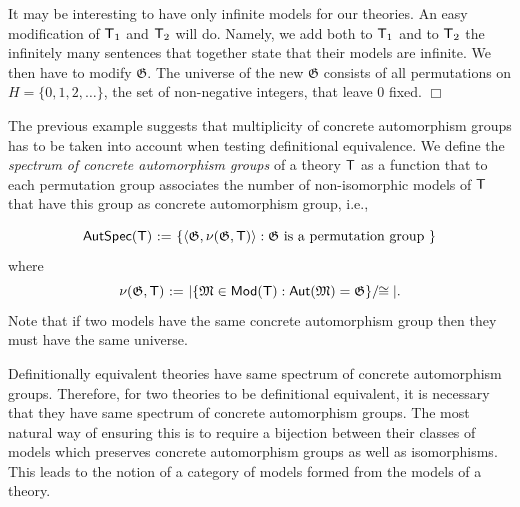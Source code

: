 \documentclass[12pt,leqno]{article}
\newcommand{\de}{\mbox{\ :=\ }}
\newcommand{\Mm}{\mbox{$\mathfrak M$}}
\newcommand{\Gg}{\mbox{$\mathfrak G$}}
\newcommand{\Aut}{\mbox{\sf Aut}}
\newcommand{\AutSpec}{\mbox{\sf AutSpec}}
\newcommand{\T}{\mbox{\sf T}}
\newcommand{\Mod}{\mbox{\sf Mod}}
\begin{document}
It may be interesting to have only infinite models for our theories.
An easy modification of $\T_1$ and $\T_2$ will do. Namely, we add
both to $\T_1$ and to $\T_2$ the infinitely many sentences that
together state that their models are infinite. We then have to
modify $\Gg$. The universe of the new $\Gg$ consists of
all permutations on $H=\{ 0,1,2,\dots\}$, the set of non-negative
integers, that leave 0 fixed. $\Box$
\bigskip

The previous example suggests that multiplicity of concrete automorphism
groups has to be taken into account when testing definitional
equivalence. We define the {\it spectrum of concrete automorphism groups} of a theory $\T$ as
a function that to each permutation group associates the number of non-isomorphic models of $\T$ that have this group as concrete automorphism group, i.e.,

\[ \AutSpec(\T)\de \{\langle \Gg, \nu(\Gg,\T)\rangle : \Gg \mbox{ is a permutation group }\}\]
where
\[\nu(\Gg,\T) \de \vert\{\Mm\in\Mod(\T) : \Aut(\Mm)=\Gg\}\slash\!\!\cong\vert.\]
%
Note that if two models have the same concrete automorphism group then they must have the same universe.

Definitionally equivalent theories have same spectrum of concrete automorphism groups. 
Therefore, for two theories to be definitional equivalent, it is necessary that they have same spectrum of concrete automorphism groups.
The most natural way of ensuring this is to require a bijection between their classes of models which preserves concrete automorphism groups as well as isomorphisms. This leads to the notion of a category of models formed from the models of a theory. 
\end{document}
